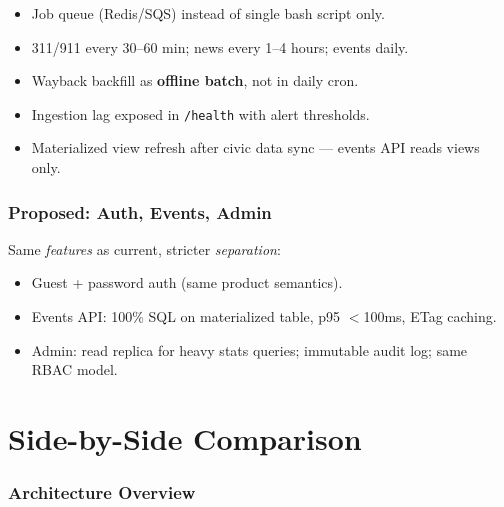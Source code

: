 \documentclass[11pt,a4paper]{article}
\begin{document}
\begin{itemize}
  \item Job queue (Redis/SQS) instead of single bash script only.
  \item 311/911 every 30--60 min; news every 1--4 hours; events daily.
  \item Wayback backfill as \textbf{offline batch}, not in daily cron.
  \item Ingestion lag exposed in \texttt{/health} with alert thresholds.
  \item Materialized view refresh after civic data sync --- events API reads views only.
\end{itemize}

\section{Proposed: Auth, Events, Admin}

Same \emph{features} as current, stricter \emph{separation}:
\begin{itemize}
  \item Guest + password auth (same product semantics).
  \item Events API: 100\% SQL on materialized table, p95 $<$100ms, ETag caching.
  \item Admin: read replica for heavy stats queries; immutable audit log; same RBAC model.
\end{itemize}

\part{Side-by-Side Comparison}

\section{Architecture Overview}
\end{document}
